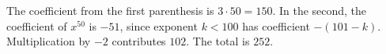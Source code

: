 The coefficient from the first parenthesis is $3\cdot50=150$. In the second, the coefficient of $x^{50}$ is $-51$, since exponent $k<100$ has coefficient $-(101-k)$. Multiplication by $-2$ contributes $102$. The total is $\boxed{252}$.
